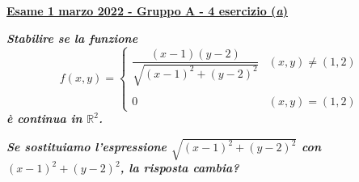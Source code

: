 \documentclass[a4paper]{article}
\newcommand{\definition}[1]{\textcolor{Red3}{\textbf{#1}}}
\newcommand{\example}[1]{\textcolor{Green4}{\textbf{#1}}}
\begin{document}
	\newpage

	\begin{flushleft}\label{exam: esame 01 marzo 2022 - Gruppo A - 4 esercizio (a)}
		\definition{\underline{Esame 1 marzo 2022 - Gruppo A - 4 esercizio (\emph{a})}}
	\end{flushleft}
	\example{\emph{Stabilire se la funzione}
	\begin{equation*}
		f\left(x,y\right) = \begin{cases}
			\dfrac{\left(x-1\right)\left(y-2\right)}{\sqrt{\left(x-1\right)^{2} + \left(y-2\right)^{2}}} & \left(x,y\right) \ne \left(1,2\right) \\
			\\
			0 & \left(x,y\right) = \left(1,2\right)
		\end{cases}
	\end{equation*}
	\emph{è continua in $\mathbb{R}^{2}$.}}

	\noindent
	\example{\emph{Se sostituiamo l'espressione $\sqrt{\left(x-1\right)^{2} + \left(y-2\right)^{2}}$ con $\left(x-1\right)^{2} + \left(y-2\right)^{2}$, la risposta cambia?}}\newline
\end{document}
